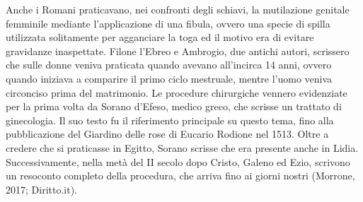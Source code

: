 Anche i Romani praticavano, nei confronti degli schiavi, la mutilazione genitale femminile mediante l’applicazione di una fibula, ovvero una specie di spilla utilizzata solitamente per agganciare la toga ed il motivo era di evitare gravidanze inaspettate. 
Filone l’Ebreo e Ambrogio, due antichi autori, scrissero che sulle donne veniva praticata quando avevano all’incirca 14 anni, ovvero quando iniziava a comparire il primo ciclo mestruale, mentre l’uomo veniva circonciso prima del matrimonio. 
Le procedure chirurgiche vennero evidenziate per la prima volta da Sorano d’Efeso, medico greco, che scrisse un trattato di ginecologia. Il suo testo fu il riferimento principale su questo tema, fino alla pubblicazione del Giardino delle rose di Eucario Rodione nel 1513. Oltre a credere che si praticasse in Egitto, Sorano scrisse che era presente anche in Lidia. Successivamente, nella metà del II secolo dopo Cristo, Galeno ed Ezio, scrivono un resoconto completo della procedura, che arriva fino ai giorni nostri (Morrone, 2017; Diritto.it). 
